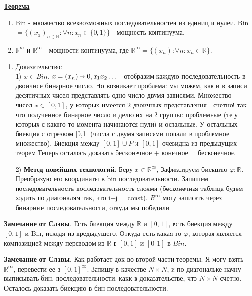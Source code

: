 \documentclass{article}
\newcommand{\thmm}[1]{\underline{\textbf{#1}}}
\newcommand{\prooff}[1]{{\underline{Доказательство:}} \\ }
\begin{document}
\thmm{Теорема}
\begin{enumerate}
    \item Bin - множество всеввозможных последовательностей из единиц и нулей. Bin $= \{(x_n)_{n \in \mathbb{N}}: \forall n: x_n \in \{0,1\}\} $ - мощность континуума.
    \item $\mathbb{R}^m$ и $\mathbb{R}^{\infty}$ - мощности континуума, где $\mathbb{R}^{\infty} = \{(x_n): \forall n: x_n \in \mathbb{R}\}$.


\end{enumerate}
\begin{enumerate}
    \item[]\prooff{}
    1) $x\in Bin$. $x=(x_n) \shortrightarrow 0,x_1x_2\ldots$ - отобразим каждую последовательность  в двоичное бинарное число. Но возникает проблема: мы можем, как и в записи десятичных чисел представлять одно число двумя записями. Множество чисел $x \in [0,1] $, у которых имеется 2 двоичных представления - счетно! так что полученное бинарное число и делю их на 2 группы: проблемные (те у которых с какого-то момента начинаются нули) и остальные. У остальных биекция с отрезком [0,1] (числа с двумя записями попали в проблемное множество). Биекция между $[0,1] \cup P$ и $[0,1]$ очевидна из предыдущих теорем Теперь осталось  доказать бесконечное + конечное = бесконечное.

    2) \textbf{Метод новейших технологий:} Беру $x \in \mathbb{R}^{\infty}$, Зафиксируем биекцию $\varphi: \mathbb{R}$. Преобразую его координаты в bin последовательности. Запишем последовательность последовательность слоями (бесконечная таблица будем ходить по диагоналям так, что i+j = const). $R^{\infty}$ могу записать через бинарные последовательности, откуда мы победили
\end{enumerate}

\textbf{Замечание от Славы}. Есть биекция между $\mathbb{R}$ и $[0,1]$, есть биекция между $[0,1]$ и Bin, исходя из предыдущего. Откуда есть какая-то $\varphi$, которая является композицией между переводом из $\mathbb{R}$ в $[0,1]$ и $[0,1]$ в $Bin$.

\textbf{Замечание от Славы}. Как работает док-во второй части теоремы. Я могу взять $\mathbb{R}^{\infty}$, перевести ее в $[0,1]^{\infty}$. Запишу в качестве $N\times N$, и по диагональке начну выписывать бин. последовательности, какк в доказательстве, что $N\times N$ счетно. Осталось доказать биекцию в бин последовательности.
\end{document}
